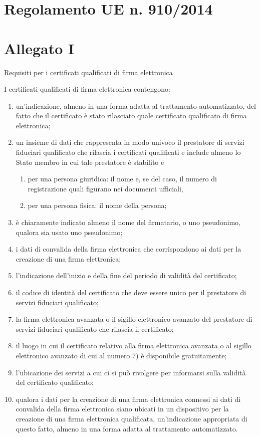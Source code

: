 \section*{Regolamento UE n. 910/2014}
\section*{Allegato I}\label{sec:allegatoIreg9102014}
Requisiti per i certificati qualificati di firma elettronica\par I certificati qualificati di firma elettronica contengono:
\begin{enumerate}
	\item 	un’indicazione, almeno in una forma adatta al trattamento automatizzato, del fatto che il certificato è stato rilasciato quale certificato qualificato di firma elettronica;
	\item un insieme di dati che rappresenta in modo univoco il prestatore di servizi fiduciari qualificato che rilascia i certificati qualificati e include almeno lo Stato membro in cui tale prestatore è stabilito e
	\begin{enumerate}
		\item per una persona giuridica: il nome e, se del caso, il numero di registrazione quali figurano nei documenti ufficiali,
		\item per una persona fisica: il nome della persona;
	\end{enumerate}
\item è chiaramente indicato almeno il nome del firmatario, o uno pseudonimo, qualora sia usato uno pseudonimo;
\item i dati di convalida della firma elettronica che corrispondono ai dati per la creazione di una firma elettronica;
\item l’indicazione dell’inizio e della fine del periodo di validità del certificato;
\item il codice di identità del certificato che deve essere unico per il prestatore di servizi fiduciari qualificato;
\item 	
la firma elettronica avanzata o il sigillo elettronico avanzato del prestatore di servizi fiduciari qualificato che rilascia il certificato;
\item il luogo in cui il certificato relativo alla firma elettronica avanzata o al sigillo elettronico avanzato di cui al numero 7) è disponibile gratuitamente;
\item 	
l’ubicazione dei servizi a cui ci si può rivolgere per informarsi sulla validità del certificato qualificato;
\item qualora i dati per la creazione di una firma elettronica connessi ai dati di convalida della firma elettronica siano ubicati in un dispositivo per la creazione di una firma elettronica qualificata, un’indicazione appropriata di questo fatto, almeno in una forma adatta al trattamento automatizzato.
\end{enumerate}
